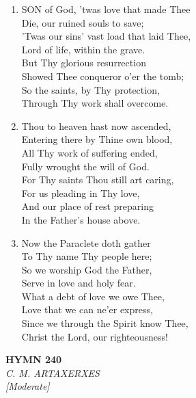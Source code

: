 \begin{enumerate}
    \item SON of God, 'twas love that made Thee \\
            Die, our ruined souls to save; \\
        'Twas our sins' vast load that laid Thee, \\
            Lord of life, within the grave. \\
        But Thy glorious resurrection \\
            Showed Thee conqueror o'er the tomb; \\
        So the saints, by Thy protection, \\
            Through Thy work shall overcome.

    \item Thou to heaven hast now ascended, \\
            Entering there by Thine own blood, \\
        All Thy work of suffering ended, \\
            Fully wrought the will of God. \\
        For Thy saints Thou still art caring, \\
            For us pleading in Thy love, \\
        And our place of rest preparing \\
            In the Father's house above.

    \item Now the Paraclete doth gather \\
            To Thy name Thy people here; \\
        So we worship God the Father, \\
            Serve in love and holy fear. \\
        What a debt of love we owe Thee, \\
            Love that we can ne'er express, \\
        Since we through the Spirit know Thee, \\
            Christ the Lord, our righteousness!

\end{enumerate}

\newpage
\begin{center}
    {\Large \textbf{HYMN 240}}
    \\
    \textit{C. M. ARTAXERXES}
    \\
    \textit{\small [Moderate]}
\end{center}
\vspace{1em}

